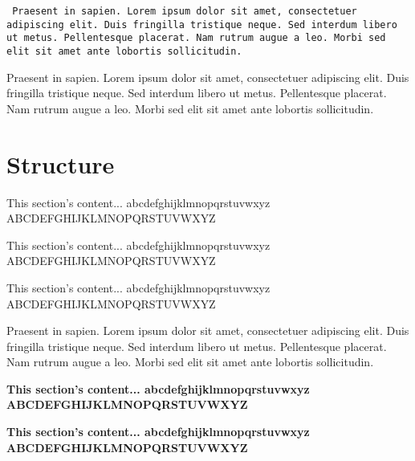 \texttt{
Praesent in sapien. Lorem ipsum dolor sit amet, consectetuer adipiscing elit.
Duis fringilla tristique neque. Sed interdum libero ut metus. Pellentesque placerat.
Nam rutrum augue a leo. Morbi sed elit sit amet ante lobortis sollicitudin.
}

Praesent in sapien. Lorem ipsum dolor sit amet, consectetuer adipiscing elit.
Duis fringilla tristique neque. Sed interdum libero ut metus. Pellentesque placerat.
Nam rutrum augue a leo. Morbi sed elit sit amet ante lobortis sollicitudin.

\clearpage %

\section*{Structure}
\small{This section's content... \newline
abcdefghijklmnopqrstuvwxyz \newline
ABCDEFGHIJKLMNOPQRSTUVWXYZ }

\tiny{This section's content... \newline
abcdefghijklmnopqrstuvwxyz \newline
ABCDEFGHIJKLMNOPQRSTUVWXYZ }

\normalsize{This section's content... \newline
abcdefghijklmnopqrstuvwxyz \newline
ABCDEFGHIJKLMNOPQRSTUVWXYZ }

Praesent in sapien. Lorem ipsum dolor sit amet, consectetuer adipiscing elit.
Duis fringilla tristique neque. Sed interdum libero ut metus. Pellentesque placerat.
Nam rutrum augue a leo. Morbi sed elit sit amet ante lobortis sollicitudin.

\textbf{
\small{This section's content... \newline
abcdefghijklmnopqrstuvwxyz \newline
ABCDEFGHIJKLMNOPQRSTUVWXYZ }}

\textbf{
\tiny{This section's content... \newline
abcdefghijklmnopqrstuvwxyz \newline
ABCDEFGHIJKLMNOPQRSTUVWXYZ }}

